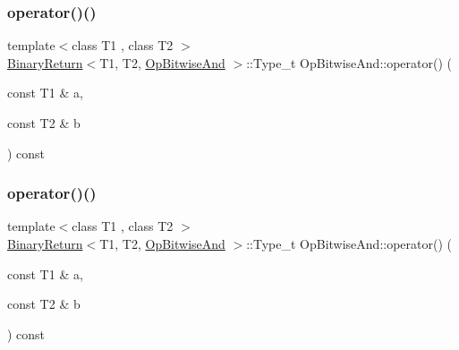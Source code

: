 \subsubsection{\texorpdfstring{operator()()}{operator()()}\hspace{0.1cm}{\footnotesize\ttfamily [1/3]}}
{\footnotesize\ttfamily template$<$class T1 , class T2 $>$ \\
\mbox{\hyperlink{structBinaryReturn}{Binary\+Return}}$<$T1, T2, \mbox{\hyperlink{structOpBitwiseAnd}{Op\+Bitwise\+And}} $>$\+::Type\+\_\+t Op\+Bitwise\+And\+::operator() (\begin{DoxyParamCaption}\item[{const T1 \&}]{a,  }\item[{const T2 \&}]{b }\end{DoxyParamCaption}) const\hspace{0.3cm}{\ttfamily [inline]}}

\mbox{\label{structOpBitwiseAnd_aa3f0de5d7060f7385f0fb035d16f09d3}} 
\subsubsection{\texorpdfstring{operator()()}{operator()()}\hspace{0.1cm}{\footnotesize\ttfamily [2/3]}}
{\footnotesize\ttfamily template$<$class T1 , class T2 $>$ \\
\mbox{\hyperlink{structBinaryReturn}{Binary\+Return}}$<$T1, T2, \mbox{\hyperlink{structOpBitwiseAnd}{Op\+Bitwise\+And}} $>$\+::Type\+\_\+t Op\+Bitwise\+And\+::operator() (\begin{DoxyParamCaption}\item[{const T1 \&}]{a,  }\item[{const T2 \&}]{b }\end{DoxyParamCaption}) const\hspace{0.3cm}{\ttfamily [inline]}}

\mbox{\label{structOpBitwiseAnd_aa3f0de5d7060f7385f0fb035d16f09d3}} 
